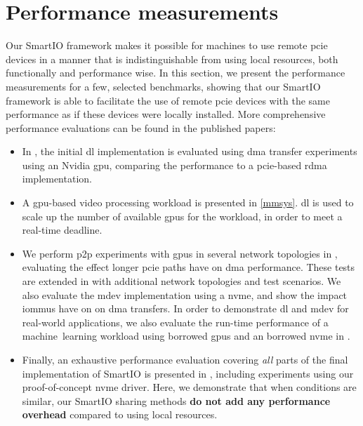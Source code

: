 \section{Performance measurements}\label{sec:eval}
Our SmartIO framework makes it possible for machines to use remote \gls{pcie} devices in a manner that is indistinguishable from using local resources, both functionally and performance wise.
%
In this section, we present the performance measurements for a few, selected benchmarks, showing that our SmartIO framework is able to facilitate the use of remote \gls{pcie} devices with the same performance as if these devices were locally installed.
%
More comprehensive performance evaluations can be found in the published papers:
%
\begin{itemize}
    \item In , the initial \gls{dl} implementation is evaluated using \gls{dma} transfer experiments using an Nvidia \gls{gpu}, comparing the performance to a \gls{pcie}-based \gls{rdma} implementation.

    \item A \gls{gpu}-based video processing workload is presented in \cref{mmsys}. \Gls{dl} is used to scale up the number of available \glspl{gpu} for the workload, in order to meet a real-time deadline.

    \item We perform \gls{p2p} experiments with \glspl{gpu} in several network topologies in , evaluating the effect longer \gls{pcie} paths have on \gls{dma} performance. These tests are extended in  with additional network topologies and test scenarios.
        We also evaluate the \gls{mdev} implementation using a  \gls{nvme}, and show the impact \glspl{iommu} have on on \gls{dma} transfers. 
        In order to demonstrate \gls{dl} and \gls{mdev} for real-world applications, we also evaluate the run-time performance of a machine~learning workload using borrowed \glspl{gpu} and an borrowed \gls{nvme} in .

    \item Finally, an exhaustive performance evaluation covering \emph{all} parts of the final implementation of SmartIO is presented in , including experiments using our proof-of-concept \gls{nvme} driver. Here, we demonstrate that when conditions are similar, our SmartIO sharing methods \textbf{do not add any performance overhead} compared to using local resources.
\end{itemize}



